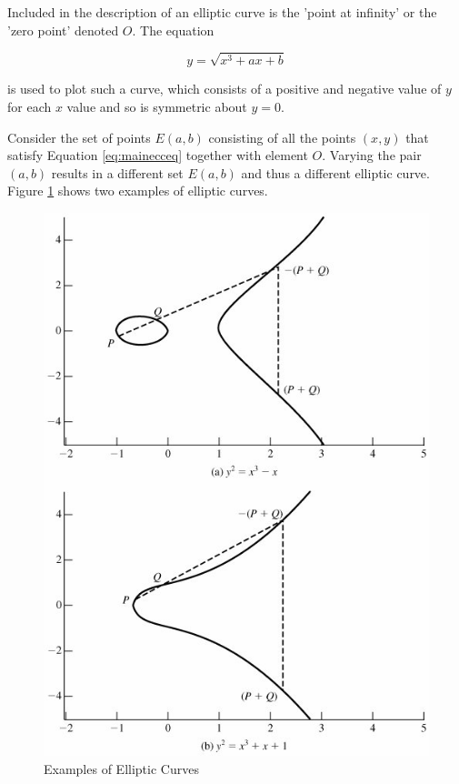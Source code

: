 \documentclass[a4paper,10pt]{report}
\begin{document}
Included in the description of an elliptic curve is the 'point at infinity' or the 'zero point' denoted $O$. The equation

\[y = \sqrt{x^3 + ax + b}\]

is used to plot such a curve, which consists of a positive and negative value of $y$ for each $x$ value and so is symmetric about $y=0$. 

Consider the set of points $E(a,b)$ consisting of all the points $(x,y)$ that satisfy Equation \ref{eq:mainecceq} together with element $O$. Varying the pair $(a,b)$ results in a different set $E(a,b)$ and thus a different elliptic curve. Figure \ref{fig:eccbaseexample} shows two examples of elliptic curves. 

\begin{figure}[htb]
\centering
\includegraphics[scale=0.7]{images/eccbaseexample.jpg}
\caption{Examples of Elliptic Curves}
\label{fig:eccbaseexample}
\end{figure}
\end{document}
